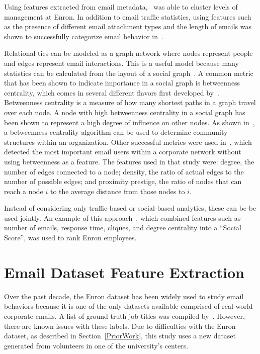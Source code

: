 \documentclass[12pt]{report}
\begin{document}
Using features extracted from email metadata,~\cite{yelupula_social_2008} was able to cluster levels of management at Enron.
In addition to email traffic statistics, using features such as the presence of different email attachment types and the length of emails was shown to successfully categorize email behavior in~\cite{martin_analyzing_2005}.

Relational ties can be modeled as a graph network where nodes represent people and edges represent email interactions.
This is a useful model because many statistics can be calculated from the layout of a social graph~\cite{wasserman_social_1994}.
A common metric that has been shown to indicate importance in a social graph is betweenness centrality, which comes in several different flavors first developed by~\cite{freeman_set_1977}.
Betweenness centrality is a measure of how many shortest paths in a graph travel over each node.
A node with high betweenness centrality in a social graph has been shown to represent a high degree of influence on other nodes.
As shown in~\cite{tyler_email_2003}, a betweenness centrality algorithm can be used to determine community structures within an organization.
Other successful metrics were used in~\cite{wilson_discovery_2009}, which detected the most important email users within a corporate network without using betweenness as a feature.
The features used in that study were: degree, the number of edges connected to a node; density, the ratio of actual edges to the number of possible edges; and proximity prestige, the ratio of nodes that can reach a node $i$ to the average distance from those nodes to $i$.

Instead of considering only traffic-based or social-based analytics, these can be be used jointly.
An example of this approach~\cite{rowe_automated_2007}, which combined features such as number of emails, response time, cliques, and degree centrality into a ``Social Score'', was used to rank Enron employees.  

\chapter{Email Dataset Feature Extraction} \label{Data}

Over the past decade, the Enron dataset has been widely used to study email behaviors because it is one of the only datasets available comprised of real-world corporate emails.
A list of ground truth job titles was compiled by~\cite{shetty_status_2004}.  However, there are known issues with these labels.
Due to difficulties with the Enron dataset, as described in Section~\ref{PriorWork}, this study uses a new dataset generated from volunteers in one of the university's centers.
\end{document}
